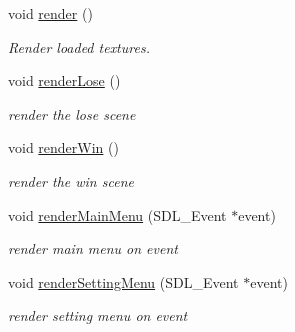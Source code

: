\begin{DoxyCompactItemize}
\mbox{\label{class_display_system_a5ad6cd01e1ed36895fb2bf08530853b6}} 
void \mbox{\hyperlink{class_display_system_a5ad6cd01e1ed36895fb2bf08530853b6}{render}} ()
\begin{DoxyCompactList}\small\item\em Render loaded textures. \end{DoxyCompactList}\item 
\mbox{\label{class_display_system_ae6988e6929ce5cac5a19407a7429c878}} 
void \mbox{\hyperlink{class_display_system_ae6988e6929ce5cac5a19407a7429c878}{render\+Lose}} ()
\begin{DoxyCompactList}\small\item\em render the lose scene \end{DoxyCompactList}\item 
\mbox{\label{class_display_system_a04ccb66606619fd9b3f5d713fd4d732d}} 
void \mbox{\hyperlink{class_display_system_a04ccb66606619fd9b3f5d713fd4d732d}{render\+Win}} ()
\begin{DoxyCompactList}\small\item\em render the win scene \end{DoxyCompactList}\item 
\mbox{\label{class_display_system_a206294a40f10f73c77054f0065bacd97}} 
void \mbox{\hyperlink{class_display_system_a206294a40f10f73c77054f0065bacd97}{render\+Main\+Menu}} (S\+D\+L\+\_\+\+Event $\ast$event)
\begin{DoxyCompactList}\small\item\em render main menu on event \end{DoxyCompactList}\item 
\mbox{\label{class_display_system_a01b0fae9f68773ab75dfab51002a5a8d}} 
void \mbox{\hyperlink{class_display_system_a01b0fae9f68773ab75dfab51002a5a8d}{render\+Setting\+Menu}} (S\+D\+L\+\_\+\+Event $\ast$event)
\begin{DoxyCompactList}\small\item\em render setting menu on event \end{DoxyCompactList}\item 
\mbox{\label{class_display_system_aad59400c0b45f9b32f61ab40b181c27c}} 

\end{DoxyCompactItemize}
